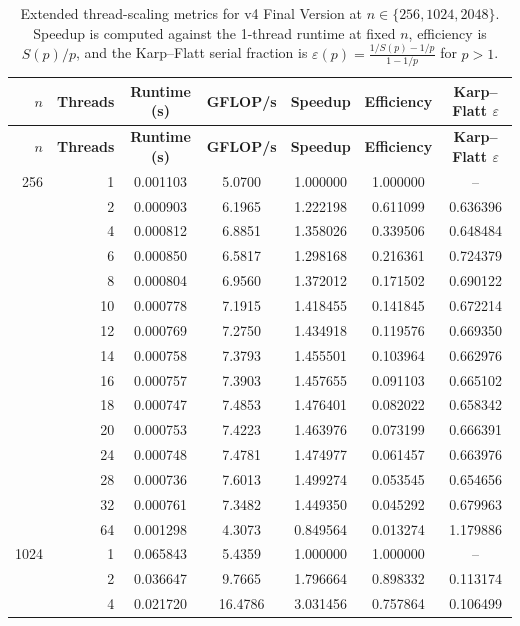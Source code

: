 \begin{longtable}{rrccccc}
\caption{Extended thread-scaling metrics for v4 Final Version at $n \in \{256, 1024, 2048\}$. Speedup is computed against the 1-thread runtime at fixed $n$, efficiency is $S(p)/p$, and the Karp--Flatt serial fraction is $\varepsilon(p)=\frac{1/S(p)-1/p}{1-1/p}$ for $p>1$.}\\
\toprule
\textbf{$n$} & \textbf{Threads} & \textbf{Runtime (s)} & \textbf{GFLOP/s} & \textbf{Speedup} & \textbf{Efficiency} & \textbf{Karp--Flatt $\varepsilon$} \\
\midrule
\endfirsthead
\toprule
\textbf{$n$} & \textbf{Threads} & \textbf{Runtime (s)} & \textbf{GFLOP/s} & \textbf{Speedup} & \textbf{Efficiency} & \textbf{Karp--Flatt $\varepsilon$} \\
\midrule
\endhead
256 & 1 & 0.001103 & 5.0700 & 1.000000 & 1.000000 & -- \\
 & 2 & 0.000903 & 6.1965 & 1.222198 & 0.611099 & 0.636396 \\
 & 4 & 0.000812 & 6.8851 & 1.358026 & 0.339506 & 0.648484 \\
 & 6 & 0.000850 & 6.5817 & 1.298168 & 0.216361 & 0.724379 \\
 & 8 & 0.000804 & 6.9560 & 1.372012 & 0.171502 & 0.690122 \\
 & 10 & 0.000778 & 7.1915 & 1.418455 & 0.141845 & 0.672214 \\
 & 12 & 0.000769 & 7.2750 & 1.434918 & 0.119576 & 0.669350 \\
 & 14 & 0.000758 & 7.3793 & 1.455501 & 0.103964 & 0.662976 \\
 & 16 & 0.000757 & 7.3903 & 1.457655 & 0.091103 & 0.665102 \\
 & 18 & 0.000747 & 7.4853 & 1.476401 & 0.082022 & 0.658342 \\
 & 20 & 0.000753 & 7.4223 & 1.463976 & 0.073199 & 0.666391 \\
 & 24 & 0.000748 & 7.4781 & 1.474977 & 0.061457 & 0.663976 \\
 & 28 & 0.000736 & 7.6013 & 1.499274 & 0.053545 & 0.654656 \\
 & 32 & 0.000761 & 7.3482 & 1.449350 & 0.045292 & 0.679963 \\
 & 64 & 0.001298 & 4.3073 & 0.849564 & 0.013274 & 1.179886 \\
1024 & 1 & 0.065843 & 5.4359 & 1.000000 & 1.000000 & -- \\
 & 2 & 0.036647 & 9.7665 & 1.796664 & 0.898332 & 0.113174 \\
 & 4 & 0.021720 & 16.4786 & 3.031456 & 0.757864 & 0.106499 \\

\end{longtable}
